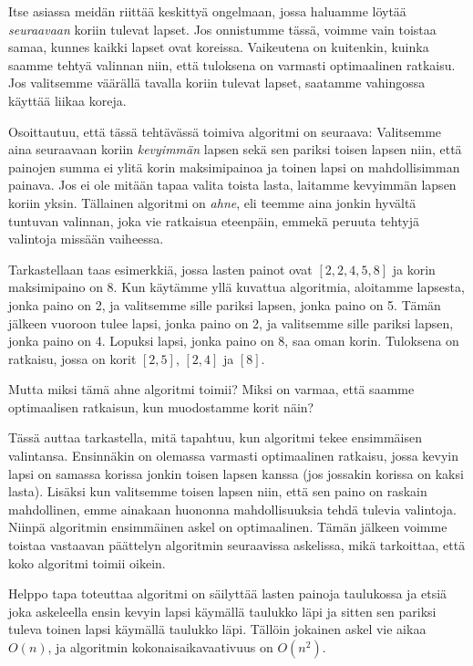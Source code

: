 Itse asiassa meidän riittää keskittyä ongelmaan,
jossa haluamme löytää \emph{seuraavaan} koriin
tulevat lapset.
Jos onnistumme tässä, voimme vain toistaa samaa,
kunnes kaikki lapset ovat koreissa.
Vaikeutena on kuitenkin, kuinka saamme tehtyä valinnan niin,
että tuloksena on varmasti optimaalinen ratkaisu.
Jos valitsemme väärällä tavalla koriin tulevat lapset,
saatamme vahingossa käyttää liikaa koreja.

Osoittautuu, että tässä tehtävässä toimiva algoritmi
on seuraava:
Valitsemme aina seuraavaan koriin
\emph{kevyimmän} lapsen sekä sen pariksi
toisen lapsen niin, että painojen summa ei ylitä
korin maksimipainoa ja toinen lapsi on
mahdollisimman painava.
Jos ei ole mitään tapaa valita toista lasta,
laitamme kevyimmän lapsen koriin yksin.
Tällainen algoritmi on \emph{ahne}, eli teemme aina jonkin hyvältä
tuntuvan valinnan, joka vie ratkaisua eteenpäin,
emmekä peruuta tehtyjä valintoja missään vaiheessa.

Tarkastellaan taas esimerkkiä,
jossa lasten painot ovat $[2,2,4,5,8]$
ja korin maksimipaino on 8.
Kun käytämme yllä kuvattua algoritmia,
aloitamme lapsesta, jonka paino on 2,
ja valitsemme sille pariksi lapsen, jonka paino on 5.
Tämän jälkeen vuoroon tulee lapsi, jonka paino on 2,
ja valitsemme sille pariksi lapsen, jonka paino on 4.
Lopuksi lapsi, jonka paino on 8, saa oman korin.
Tuloksena on ratkaisu,
jossa on korit $[2,5]$, $[2,4]$ ja $[8]$.

Mutta miksi tämä ahne algoritmi toimii?
Miksi on varmaa, että saamme optimaalisen ratkaisun,
kun muodostamme korit näin?

Tässä auttaa tarkastella, mitä tapahtuu,
kun algoritmi tekee ensimmäisen valintansa.
Ensinnäkin on olemassa varmasti optimaalinen ratkaisu,
jossa kevyin lapsi on samassa korissa jonkin toisen lapsen kanssa
(jos jossakin korissa on kaksi lasta).
Lisäksi kun valitsemme toisen lapsen niin,
että sen paino on raskain mahdollinen,
emme ainakaan huononna mahdollisuuksia tehdä tulevia valintoja.
Niinpä algoritmin ensimmäinen askel on optimaalinen.
Tämän jälkeen voimme toistaa vastaavan päättelyn
algoritmin seuraavissa askelissa, mikä tarkoittaa,
että koko algoritmi toimii oikein.

Helppo tapa toteuttaa algoritmi on säilyttää lasten
painoja taulukossa ja etsiä joka askeleella ensin
kevyin lapsi käymällä taulukko läpi ja sitten sen 
pariksi tuleva toinen lapsi käymällä taulukko läpi.
Tällöin jokainen askel vie aikaa $O(n)$,
ja algoritmin kokonaisaikavaativuus on $O(n^2)$.


